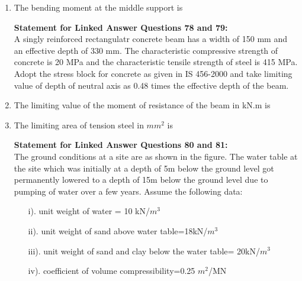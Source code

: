 \documentclass[journal]{IEEEtran}
\begin{document}
\begin{enumerate}[start=74]
\item %
The bending moment at the middle support is 
\begin{enumerate}
\end{enumerate}


\textbf{Statement for Linked Answer Questions 78 and 79:}\\
A singly reinforced rectangulatr concrete beam has a width of 150 mm and an effective depth of 330 mm. The characteristic compressive strength of concrete is 20 MPa and the characteristic tensile strength of steel is 415 MPa. Adopt the stress block for concrete as given in IS 456-2000 and take limiting value of depth of neutral axis as 0.48 times the effective depth of the beam. 
\item %
The limiting value of the moment of resistance of the beam in kN.m is\\
\begin{enumerate}
\end{enumerate}

\item %
The limiting area of tension steel in $mm^2$ is 
\begin{enumerate}
\end{enumerate}

\textbf{Statement for Linked Answer Questions 80 and 81:}\\
The ground conditions at a site are as shown in the figure. The water table at the site which was initially at a depth of 5m below the ground level got permanently lowered to a depth of 15m below the ground level due to pumping of water over a few years. Assume the following data: \\
\begin{itemize}
    \item[i).] unit weight of water = 10 kN/$m^3$
    \item[ii).] unit weight of sand above water table=18kN/$m^3$
    \item[iii).] unit weight of sand and clay below the water table= 20kN/$m^3$
    \item[iv).] coefficient of volume compressibility=0.25 $m^2$/MN
\end{itemize}


\end{enumerate}
\end{document}
